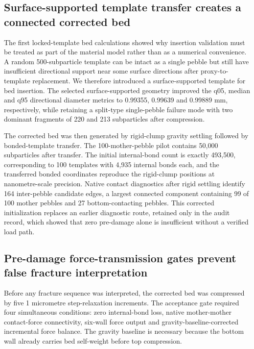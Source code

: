 \documentclass[5p,twocolumn]{elsarticle}
\begin{document}
\subsection{Surface-supported template transfer creates a connected corrected bed}

The first locked-template bed calculations showed why insertion validation must be treated as part of the material model rather than as a numerical convenience. A random 500-subparticle template can be intact as a single pebble but still have insufficient directional support near some surface directions after proxy-to-template replacement. We therefore introduced a surface-supported template for bed insertion. The selected surface-supported geometry improved the q05, median and q95 directional diameter metrics to 0.99355, 0.99639 and 0.99889 mm, respectively, while retaining a split-type single-pebble failure mode with two dominant fragments of 220 and 213 subparticles after compression.


The corrected bed was then generated by rigid-clump gravity settling followed by bonded-template transfer. The 100-mother-pebble pilot contains 50,000 subparticles after transfer. The initial internal-bond count is exactly 493,500, corresponding to 100 templates with 4,935 internal bonds each, and the transferred bonded coordinates reproduce the rigid-clump positions at nanometre-scale precision. Native contact diagnostics after rigid settling identify 164 inter-pebble candidate edges, a largest connected component containing 99 of 100 mother pebbles and 27 bottom-contacting pebbles. This corrected initialization replaces an earlier diagnostic route, retained only in the audit record, which showed that zero pre-damage alone is insufficient without a verified load path.


\subsection{Pre-damage force-transmission gates prevent false fracture interpretation}

Before any fracture sequence was interpreted, the corrected bed was compressed by five 1 micrometre step-relaxation increments. The acceptance gate required four simultaneous conditions: zero internal-bond loss, native mother-mother contact-force connectivity, six-wall force output and gravity-baseline-corrected incremental force balance. The gravity baseline is necessary because the bottom wall already carries bed self-weight before top compression.
\end{document}
